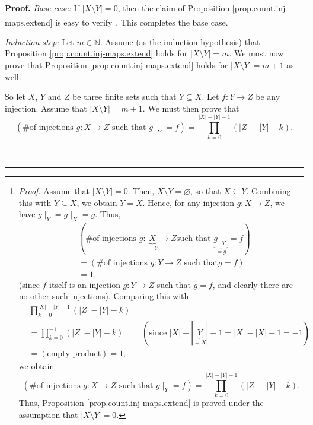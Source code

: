 \documentclass[numbers=enddot,12pt,final,onecolumn,notitlepage]{scrartcl}%
\numberwithin{exer}{section}
\theoremstyle{definition}
\newenvironment{proof}[1][Proof]{\noindent\textbf{#1.} }{\ \rule{0.5em}{0.5em}}
\let\prodnonlimits\prod
\renewcommand{\prod}{\prodnonlimits\limits}
\newenvironment{verlong}{}{}
\begin{document}
\begin{verlong}
\begin{proof}
\textit{Base case:} If $\left\vert X\setminus Y\right\vert =0$, then the claim
of Proposition \ref{prop.count.inj-maps.extend} is easy to
verify\footnote{\textit{Proof.} Assume that $\left\vert X\setminus
Y\right\vert =0$. Then, $X\setminus Y=\varnothing$, so that $X\subseteq Y$.
Combining this with $Y\subseteq X$, we obtain $Y=X$. Hence, for any injection
$g:X\rightarrow Z$, we have $\left.  g\mid_{Y}\right.  =\left.  g\mid
_{X}\right.  =g$. Thus,%
\begin{align*}
&  \left(  \text{\# of injections }g:\underbrace{X}_{=Y}\rightarrow Z\text{
such that }\underbrace{\left.  g\mid_{Y}\right.  }_{=g}=f\right) \\
&  =\left(  \text{\# of injections }g:Y\rightarrow Z\text{ such that
}g=f\right) \\
&  =1
\end{align*}
(since $f$ itself is an injection $g:Y\rightarrow Z$ such that $g=f$, and
clearly there are no other such injections). Comparing this with%
\begin{align*}
&  \prod_{k=0}^{\left\vert X\right\vert -\left\vert Y\right\vert -1}\left(
\left\vert Z\right\vert -\left\vert Y\right\vert -k\right) \\
&  =\prod_{k=0}^{-1}\left(  \left\vert Z\right\vert -\left\vert Y\right\vert
-k\right)  \ \ \ \ \ \ \ \ \ \ \left(  \text{since }\left\vert X\right\vert
-\left\vert \underbrace{Y}_{=X}\right\vert -1=\left\vert X\right\vert
-\left\vert X\right\vert -1=-1\right) \\
&  =\left(  \text{empty product}\right)  =1,
\end{align*}
we obtain%
\[
\left(  \text{\# of injections }g:X\rightarrow Z\text{ such that }\left.
g\mid_{Y}\right.  =f\right)  =\prod_{k=0}^{\left\vert X\right\vert -\left\vert
Y\right\vert -1}\left(  \left\vert Z\right\vert -\left\vert Y\right\vert
-k\right)  .
\]
Thus, Proposition \ref{prop.count.inj-maps.extend} is proved under the
assumption that $\left\vert X\setminus Y\right\vert =0$.}. This completes the
base case.

\textit{Induction step:} Let $m\in\mathbb{N}$. Assume (as the induction
hypothesis) that Proposition \ref{prop.count.inj-maps.extend} holds for
$\left\vert X\setminus Y\right\vert =m$. We must now prove that Proposition
\ref{prop.count.inj-maps.extend} holds for $\left\vert X\setminus Y\right\vert
=m+1$ as well.

So let $X$, $Y$ and $Z$ be three finite sets such that $Y\subseteq X$. Let
$f:Y\rightarrow Z$ be any injection. Assume that $\left\vert X\setminus
Y\right\vert =m+1$. We must then prove that%
\[
\left(  \text{\# of injections }g:X\rightarrow Z\text{ such that }\left.
g\mid_{Y}\right.  =f\right)  =\prod_{k=0}^{\left\vert X\right\vert -\left\vert
Y\right\vert -1}\left(  \left\vert Z\right\vert -\left\vert Y\right\vert
-k\right)  .
\]



\end{proof}
\end{verlong}
\end{document}
